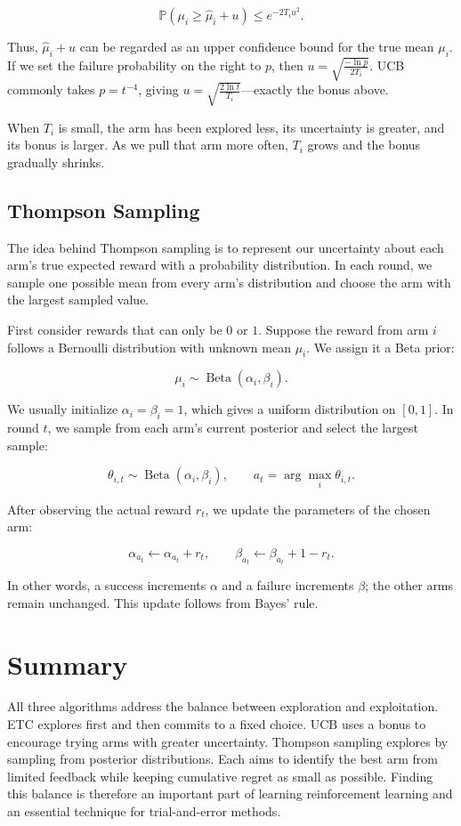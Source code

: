 \documentclass[a4paper,10pt]{article}
\begin{document}
\[
\mathbb{P}\left(\mu_i\ge\hat\mu_i+u\right)\le e^{-2T_i u^2}.
\]

Thus, \(\hat\mu_i+u\) can be regarded as an upper confidence bound for the true mean \(\mu_i\). If we set the failure probability on the right to \(p\), then \(u=\sqrt{\frac{-\ln p}{2T_i}}\). UCB commonly takes \(p=t^{-4}\), giving \(u=\sqrt{\frac{2\ln t}{T_i}}\)---exactly the bonus above.

When \(T_i\) is small, the arm has been explored less, its uncertainty is greater, and its bonus is larger. As we pull that arm more often, \(T_i\) grows and the bonus gradually shrinks.

\subsection{Thompson Sampling}

The idea behind Thompson sampling is to represent our uncertainty about each arm's true expected reward with a probability distribution. In each round, we sample one possible mean from every arm's distribution and choose the arm with the largest sampled value.

First consider rewards that can only be \(0\) or \(1\). Suppose the reward from arm \(i\) follows a Bernoulli distribution with unknown mean \(\mu_i\). We assign it a Beta prior:

\[
\mu_i\sim\operatorname{Beta}(\alpha_i,\beta_i).
\]

We usually initialize \(\alpha_i=\beta_i=1\), which gives a uniform distribution on \([0,1]\). In round \(t\), we sample from each arm's current posterior and select the largest sample:

\[
\theta_{i,t}\sim\operatorname{Beta}(\alpha_i,\beta_i),
\qquad
a_t=\arg\max_i\theta_{i,t}.
\]

After observing the actual reward \(r_t\), we update the parameters of the chosen arm:

\[
\alpha_{a_t}\leftarrow\alpha_{a_t}+r_t,
\qquad
\beta_{a_t}\leftarrow\beta_{a_t}+1-r_t.
\]

In other words, a success increments \(\alpha\) and a failure increments \(\beta\); the other arms remain unchanged. This update follows from Bayes' rule.

\section{Summary}

All three algorithms address the balance between exploration and exploitation. ETC explores first and then commits to a fixed choice. UCB uses a bonus to encourage trying arms with greater uncertainty. Thompson sampling explores by sampling from posterior distributions. Each aims to identify the best arm from limited feedback while keeping cumulative regret as small as possible. Finding this balance is therefore an important part of learning reinforcement learning and an essential technique for trial-and-error methods.
\end{document}
